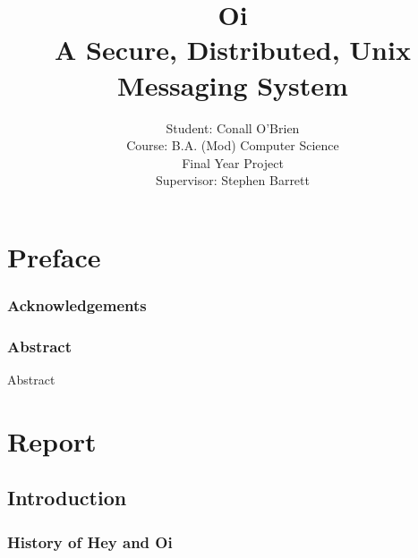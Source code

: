 \documentclass[a4paper,12pt]{report}
\begin{document}
\setlength{\rightskip}{0pt plus 2cm}

\title{Oi \\ A Secure, Distributed, Unix Messaging System}

\author{Student: Conall O'Brien \\ 
		  Course:  B.A. (Mod) Computer Science \\
		  Final Year Project \\ 
		  Supervisor: Stephen Barrett} 

\maketitle


\part*{Preface}


\section{Acknowledgements}



\pagebreak

\section{Abstract}

Abstract


\tableofcontents

\listoftables

\listoffigures


\part*{Report}


\chapter{Introduction}

\setcounter{page}{12}

\section{History of Hey and Oi}


\end{document}
